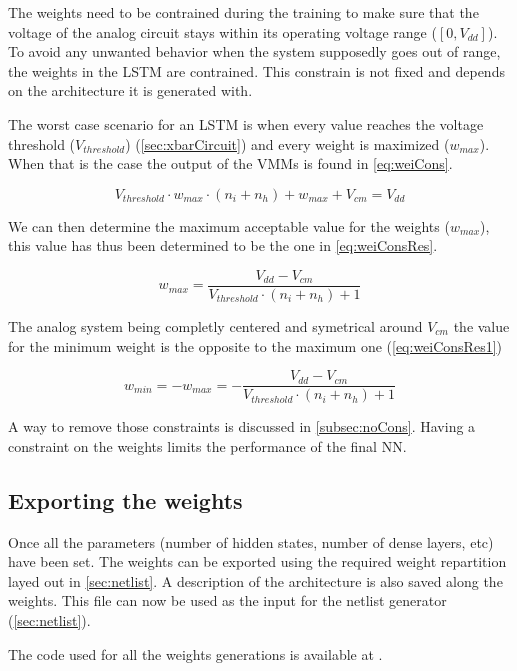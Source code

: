 The weights need to be contrained during the training to make sure that the voltage of the analog circuit stays within its operating voltage range ($[0,V_{dd}]$). To avoid any unwanted behavior when the system supposedly goes out of range, the weights in the \ac{LSTM} are contrained. This constrain is not fixed and depends on the architecture it is generated with.

The worst case scenario for an \ac{LSTM} is when every value reaches the voltage threshold ($V_{threshold}$) (\cref{sec:xbarCircuit}) and every weight is maximized ($w_{max}$). When that is the case the output of the \acp{VMM} is found in \cref{eq:weiCons}.

\begin{equation}\label{eq:weiCons}
  V_{threshold}\cdot w_{max} \cdot(n_i+n_h)+w_{max}+V_{cm}= V_{dd}
\end{equation}

We can then determine the maximum acceptable value for the weights ($w_{max}$), this value has thus been determined to be the one in \cref{eq:weiConsRes}.

\begin{equation}\label{eq:weiConsRes}
  w_{max}=\frac{V_{dd}-V_{cm}}{V_{threshold}\cdot(n_i+n_h)+1}
\end{equation}

The analog system being completly centered and symetrical around $V_{cm}$ the value for the minimum weight is the opposite to the maximum one (\cref{eq:weiConsRes1})

\begin{equation}\label{eq:weiConsRes1}
  w_{min}=-w_{max}=-\frac{V_{dd}-V_{cm}}{V_{threshold}\cdot(n_i+n_h)+1}
\end{equation}

A way to remove those constraints is discussed in \cref{subsec:noCons}. Having a constraint on the weights limits the performance of the final \ac{NN}.

\subsection{Exporting the weights}

Once all the parameters (number of hidden states, number of dense layers, etc) have been set. The weights can be exported using the required weight repartition layed out in \cref{sec:netlist}. A description of the architecture is also saved along the weights. This file can now be used as the input for the netlist generator (\cref{sec:netlist}).

The code used for all the weights generations is available at \cite{lstmWei}. %
